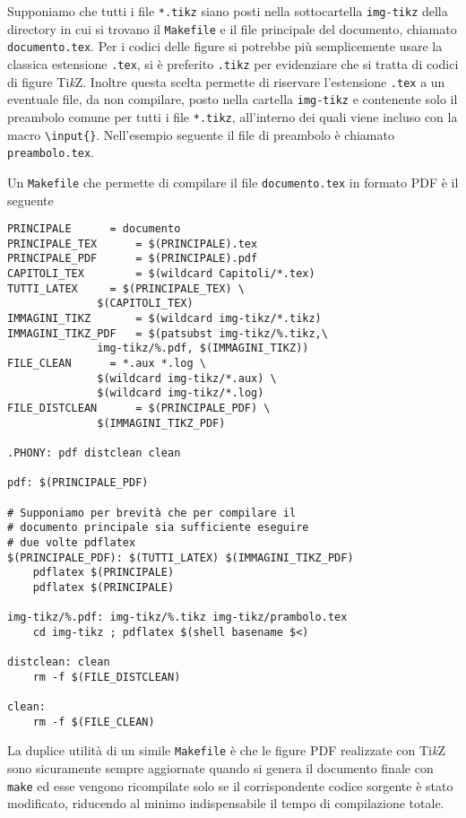 Supponiamo che tutti i file \texttt{*.tikz} siano posti nella sottocartella
\texttt{img-tikz} della directory in cui si trovano il \texttt{Makefile} e il
file principale del documento, chiamato \texttt{documento.tex}. Per i codici
delle figure si potrebbe più semplicemente usare la classica estensione
\texttt{.tex}, si è preferito \texttt{.tikz} per evidenziare che si tratta di
codici di figure Ti\emph{k}Z.  Inoltre questa scelta permette di riservare
l'estensione \texttt{.tex} a un eventuale file, da non compilare, posto nella
cartella \texttt{img-tikz} e contenente solo il preambolo comune per tutti i
file \texttt{*.tikz}, all'interno dei quali viene incluso con la macro
\texttt{\textbackslash{}input\{\}}.  Nell'esempio seguente il file di preambolo
è chiamato \texttt{preambolo.tex}.

Un \texttt{Makefile} che permette di compilare il file \texttt{documento.tex} in
formato \textsc{PDF} è il seguente
\begin{lstlisting}
PRINCIPALE 	    = documento
PRINCIPALE_TEX	    = $(PRINCIPALE).tex
PRINCIPALE_PDF	    = $(PRINCIPALE).pdf
CAPITOLI_TEX	    = $(wildcard Capitoli/*.tex)
TUTTI_LATEX	    = $(PRINCIPALE_TEX) \
		      $(CAPITOLI_TEX)
IMMAGINI_TIKZ	    = $(wildcard img-tikz/*.tikz)
IMMAGINI_TIKZ_PDF   = $(patsubst img-tikz/%.tikz,\
		      img-tikz/%.pdf, $(IMMAGINI_TIKZ))
FILE_CLEAN	    = *.aux *.log \
		      $(wildcard img-tikz/*.aux) \
		      $(wildcard img-tikz/*.log)
FILE_DISTCLEAN	    = $(PRINCIPALE_PDF) \
		      $(IMMAGINI_TIKZ_PDF)

.PHONY: pdf distclean clean

pdf: $(PRINCIPALE_PDF)

# Supponiamo per brevità che per compilare il
# documento principale sia sufficiente eseguire
# due volte pdflatex
$(PRINCIPALE_PDF): $(TUTTI_LATEX) $(IMMAGINI_TIKZ_PDF)
	pdflatex $(PRINCIPALE)
	pdflatex $(PRINCIPALE)

img-tikz/%.pdf: img-tikz/%.tikz img-tikz/prambolo.tex
	cd img-tikz ; pdflatex $(shell basename $<)

distclean: clean
	rm -f $(FILE_DISTCLEAN)

clean:
	rm -f $(FILE_CLEAN)
\end{lstlisting}
La duplice utilità di un simile \texttt{Makefile} è che le figure \textsc{PDF}
realizzate con Ti\emph{k}Z sono sicuramente sempre aggiornate quando si genera
il documento finale con \texttt{make} ed esse vengono ricompilate solo se il
corrispondente codice sorgente è stato modificato, riducendo al minimo
indispensabile il tempo di compilazione totale.

